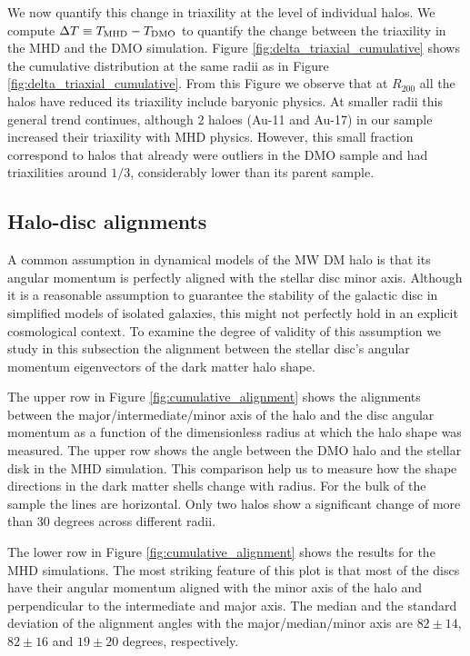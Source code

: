 \documentclass[usenatbib]{mnras}
\begin{document}
We now quantify this change in triaxility at the level of individual halos.
We compute $\Delta T\equiv T_{\rm MHD}-T_{\rm DMO}$ to quantify the
change between the triaxility in the MHD and the DMO simulation.
Figure \ref{fig:delta_triaxial_cumulative} shows the cumulative
distribution at the same radii as in
Figure \ref{fig:delta_triaxial_cumulative}.  
From this Figure we observe that at $R_{200}$ all the halos have
reduced its triaxility include baryonic physics.
At smaller radii this general trend continues, although 2 haloes (Au-11 and Au-17) 
in our sample increased their triaxility with MHD physics. 
However, this small fraction correspond to halos that already were
outliers in the DMO sample and had triaxilities around $1/3$,
considerably lower than its parent sample.


\subsection{Halo-disc alignments}

A common assumption in dynamical models of the MW DM halo is that
its angular momentum is perfectly aligned with the stellar disc minor axis.
Although it is a reasonable assumption to guarantee the stability of
the galactic disc in simplified models of isolated galaxies, this
might not perfectly hold in an explicit cosmological context. 
To examine the degree of validity of this assumption we study in this
subsection the alignment between the stellar disc's angular momentum
eigenvectors of the dark matter halo shape.


The upper row in Figure \ref{fig:cumulative_alignment} shows 
the alignments between the major/intermediate/minor axis of the
halo and the disc angular momentum as a function of the dimensionless radius at which the halo shape was measured.
The upper row shows the angle between the DMO halo and the stellar
disk in the MHD simulation.
This comparison help us to measure how the shape directions in the
dark matter shells change with radius.
For the bulk of the sample the lines are horizontal.
Only two halos show a significant change of more than 30 degrees across different radii.

The lower row in Figure \ref{fig:cumulative_alignment} shows the
results for the MHD simulations.
The most striking feature of this plot is that most of the discs have their angular momentum aligned with the minor axis of the halo and perpendicular to the intermediate and major axis.
The median and the standard deviation of the alignment angles with
the major/median/minor axis are $82\pm14$, $82\pm16$ and $19\pm20$
degrees, respectively.
\end{document}
